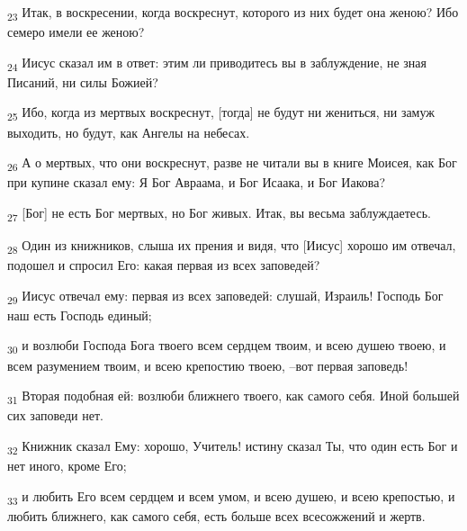 \begin{tcolorbox}
\textsubscript{23} Итак, в воскресении, когда воскреснут, которого из них будет она женою? Ибо семеро имели ее женою?
\end{tcolorbox}
\begin{tcolorbox}
\textsubscript{24} Иисус сказал им в ответ: этим ли приводитесь вы в заблуждение, не зная Писаний, ни силы Божией?
\end{tcolorbox}
\begin{tcolorbox}
\textsubscript{25} Ибо, когда из мертвых воскреснут, [тогда] не будут ни жениться, ни замуж выходить, но будут, как Ангелы на небесах.
\end{tcolorbox}
\begin{tcolorbox}
\textsubscript{26} А о мертвых, что они воскреснут, разве не читали вы в книге Моисея, как Бог при купине сказал ему: Я Бог Авраама, и Бог Исаака, и Бог Иакова?
\end{tcolorbox}
\begin{tcolorbox}
\textsubscript{27} [Бог] не есть Бог мертвых, но Бог живых. Итак, вы весьма заблуждаетесь.
\end{tcolorbox}
\begin{tcolorbox}
\textsubscript{28} Один из книжников, слыша их прения и видя, что [Иисус] хорошо им отвечал, подошел и спросил Его: какая первая из всех заповедей?
\end{tcolorbox}
\begin{tcolorbox}
\textsubscript{29} Иисус отвечал ему: первая из всех заповедей: слушай, Израиль! Господь Бог наш есть Господь единый;
\end{tcolorbox}
\begin{tcolorbox}
\textsubscript{30} и возлюби Господа Бога твоего всем сердцем твоим, и всею душею твоею, и всем разумением твоим, и всею крепостию твоею, --вот первая заповедь!
\end{tcolorbox}
\begin{tcolorbox}
\textsubscript{31} Вторая подобная ей: возлюби ближнего твоего, как самого себя. Иной большей сих заповеди нет.
\end{tcolorbox}
\begin{tcolorbox}
\textsubscript{32} Книжник сказал Ему: хорошо, Учитель! истину сказал Ты, что один есть Бог и нет иного, кроме Его;
\end{tcolorbox}
\begin{tcolorbox}
\textsubscript{33} и любить Его всем сердцем и всем умом, и всею душею, и всею крепостью, и любить ближнего, как самого себя, есть больше всех всесожжений и жертв.
\end{tcolorbox}

